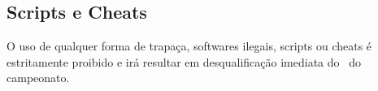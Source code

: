 \subsection{Scripts e Cheats}

O uso de qualquer forma de trapaça, softwares ilegais, scripts ou cheats é estritamente proibido e irá resultar em desqualificação imediata do \BasicUnit\ do campeonato.